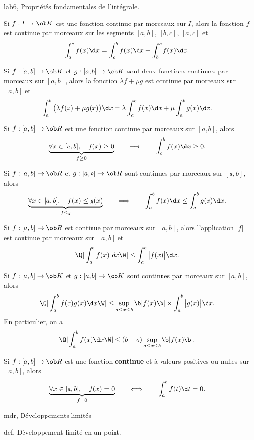 \Section lab6, Propri\'et\'es fondamentales de l'int\'egrale. 
\bigskip

\Propriete [$I$ intervalle, $(a,b,c)\in I^3$] 
Si $f:I\to\ob K$ est une fonction continue par morceaux sur $I$, alors la fonction $f$ est continue par morceaux sur les segments $[a,b]$, $[b,c]$, $[a,c]$ et 
$$
\int_a^cf(x)\d x=\int_a^bf(x)\d x+\int_b^cf(x)\d x. 
$$

\Propriete [$(a,b)\in\ob R^2$, $(\lambda,\mu)\in\ob K^2$] 
Si $f:[a,b]\to\ob K$ et $g:[a,b]\to\ob K$ sont deux fonctions continues par morceaux sur $[a,b]$, alors la fonction $\lambda f+\mu g$ est continue par morceaux sur $[a,b]$ et 
$$
\int_a^b\big(\lambda f(x)+\mu g(x)\big)\d x=\lambda \int_a^bf(x)\d x+\mu \int_a^bg(x)\d x. 
$$

\Propriete [$a\le b$] 
Si $f:[a,b]\to\ob R$ est une fonction continue par morceaux sur $[a,b]$, alors 
\Equation [\bf Positivit\'e]
$$
\underbrace{
\forall x\in[a,b],\quad f(x)\ge0}_{f\ge0}\qquad\Longrightarrow\qquad \int_a^bf(x)\d x\ge0.
$$ 


\Propriete [$a\le b$]
Si $f:[a,b]\to\ob R$ et $g:[a,b]\to\ob R$ sont continues par morceaux sur $[a,b]$, alors
\Equation [ \bf Croissance]
$$
\underbrace{
\forall x\in[a,b],\quad f(x)\le g(x)}_{f\le g}\qquad\Longrightarrow\qquad \int_a^bf(x)\d x\le \int_a^bg(x)\d x.
$$ 

\Propriete[$a\le b$] 
Si $f:[a,b]\to\ob R$ est continue par morceaux sur $[a,b]$, alors l'application $|f|$ est continue par morceaux sur $[a,b]$ et 
$$
\Q|\int_a^bf(x)\ dx\W|\le \int_a^b\big|f(x)\big|\d x.
$$ 

\Propriete [$a\le b$] 
Si $f:[a,b]\to\ob K$ et $g:[a,b]\to\ob K$ sont continues par morceaux sur $[a,b]$, alors 
$$
\Q|\int_a^bf(x)g(x)\d x\W|\le \sup_{a\le x\le b}\b|f(x)\b|\times\int_a^b\big|g(x)\big|\d x.
$$
En particulier, on a 
$$
\Q|\int_a^bf(x)\d x\W|\le (b-a)\sup_{a\le x\le b}\b|f(x)\b|.
$$



\Theoreme [$a<b$] 
Si $f:[a,b]\to\ob R$ est une fonction 
{\bf continue} et \`a valeurs positives ou nulles sur $[a,b]$, alors 
$$
\underbrace{\forall x\in[a,b],\quad f(x)=0}_{f=0}\qquad\Longleftrightarrow \qquad\int_a^bf(t)\d t=0.
$$

\Section mdr, D\'eveloppements limit\'es. 

\Subsection def, D\'eveloppement limit\'e en un point. 
\bigskip

